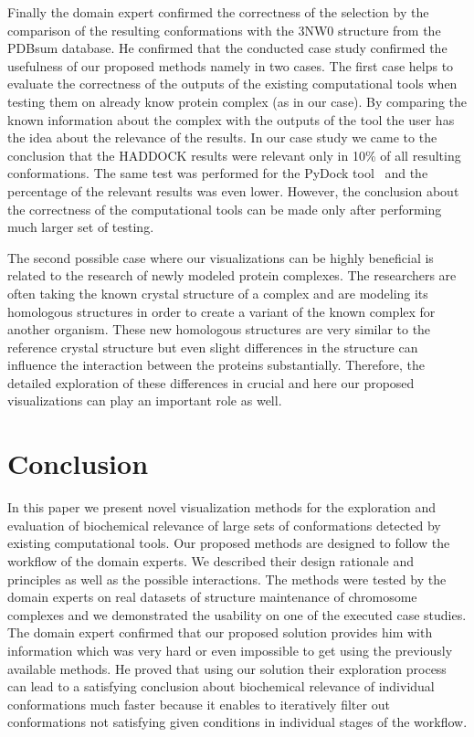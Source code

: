 \documentclass[journal]{vgtc}                %
\begin{document}
Finally the domain expert confirmed the correctness of the selection by the comparison of the resulting conformations with the 3NW0 structure from the PDBsum database.
He confirmed that the conducted case study confirmed the usefulness of our proposed methods namely in two cases.
The first case helps to evaluate the correctness of the outputs of the existing computational tools when testing them on already know protein complex (as in our case).
By comparing the known information about the complex with the outputs of the tool the user has the idea about the relevance of the results.
In our case study we came to the conclusion that the HADDOCK results were relevant only in 10\% of all resulting conformations.
The same test was performed for the PyDock tool~\cite{pydock} and the percentage of the relevant results was even lower.
However, the conclusion about the correctness of the computational tools can be made only after performing much larger set of testing.

The second possible case where our visualizations can be highly beneficial is related to the research of newly modeled protein complexes.
The researchers are often taking the known crystal structure of a complex and are modeling its homologous structures in order to create a variant of the known complex for another organism.
These new homologous structures are very similar to the reference crystal structure but even slight differences in the structure can influence the interaction between the proteins substantially.
Therefore, the detailed exploration of these differences in crucial and here our proposed visualizations can play an important role as well.

\section{Conclusion}
In this paper we present novel visualization methods for the exploration and evaluation of biochemical relevance of large sets of conformations detected by existing computational tools.
Our proposed methods are designed to follow the workflow of the domain experts.
We described their design rationale and principles as well as the possible interactions. 
The methods were tested by the domain experts on real datasets of structure maintenance of chromosome complexes and we demonstrated the usability on one of the executed case studies.
The domain expert confirmed that our proposed solution provides him with information which was very hard or even impossible to get using the previously available methods.
He proved that using our solution their exploration process can lead to a satisfying conclusion about biochemical relevance of individual conformations much faster because it enables to iteratively filter out conformations not satisfying given conditions in individual stages of the workflow.
\end{document}
